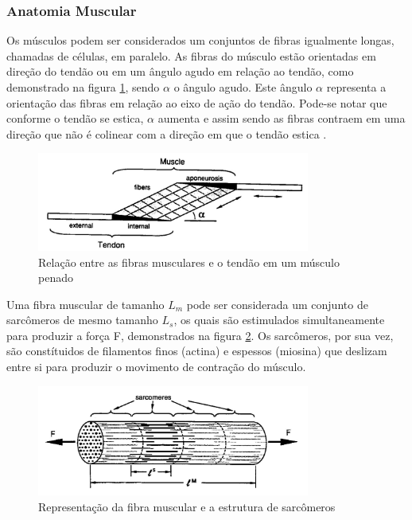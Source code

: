 \subsubsection{Anatomia Muscular}
Os músculos podem ser considerados um conjuntos de fibras igualmente longas, chamadas de células, em paralelo. As fibras do músculo estão orientadas em direção do tendão ou em um ângulo agudo em relação ao tendão, como demonstrado na figura \ref{fibras}, sendo $\alpha$ o ângulo agudo. Este ângulo $\alpha$ representa a orientação das fibras em relação ao eixo de ação do tendão. Pode-se notar que conforme o tendão se estica, $\alpha$ aumenta e assim sendo as fibras contraem em uma direção que não é colinear com a direção em que o tendão estica \cite{zajac1989muscle}.

\begin{figure}[H]
\centering
\includegraphics[width = 0.8\textwidth]{img/Zajac1989_FibrasMusculares.JPG}
\caption[Representação das Fibras Musculares]{Relação entre as fibras musculares e o tendão em um músculo penado \cite{zajac1989muscle}}
\label{fibras}
\end{figure}

Uma fibra muscular de tamanho $L_m$ pode ser considerada um conjunto de sarcômeros de mesmo tamanho $L_s$, os quais são estimulados simultaneamente para produzir a força F, demonstrados na figura \ref{sarcomeros}. Os sarcômeros, por sua vez, são constítuidos de filamentos finos (actina) e espessos (miosina) que deslizam entre si para produzir o movimento de contração do músculo.

\begin{figure}[H]
\centering
\includegraphics[width = 0.8\textwidth]{img/Zajac1989_Sarcomeros.JPG}
\caption[Representação dos Sarcômeros]{Representação da fibra muscular e a estrutura de sarcômeros \cite{zajac1989muscle}}
\label{sarcomeros}
\end{figure}

